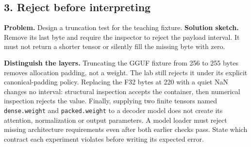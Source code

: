 \subsection*{3. Reject before interpreting}
\textbf{Problem.} Design a truncation test for the teaching fixture.
\textbf{Solution sketch.} Remove its last byte and require the inspector
to reject the payload interval. It must not return a shorter tensor or
silently fill the missing byte with zero.

\textbf{Distinguish the layers.} Truncating the GGUF fixture from
256 to 255 bytes removes allocation padding, not a weight. The lab
still rejects it under its explicit canonical-padding policy. Replacing
the F32 bytes at 220 with a quiet NaN changes no interval: structural
inspection accepts the container, then numerical inspection rejects
the value. Finally, supplying two finite tensors named
\texttt{dense.weight} and \texttt{packed.weight} to a decoder model
does not create its attention, normalization or output parameters.
A model loader must reject missing architecture requirements even
after both earlier checks pass. State which contract each experiment
violates before writing its expected error.
